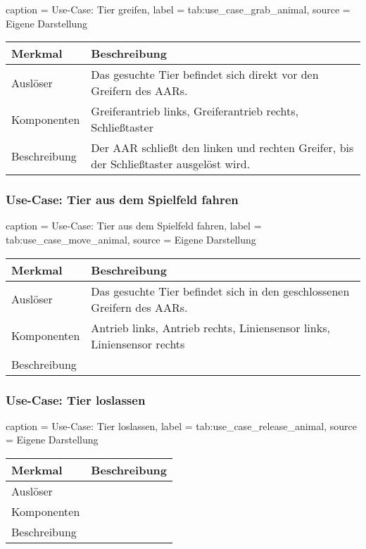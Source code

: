 \begin{dhbwtable}{%
    caption	= Use-Case: Tier greifen,
    label	= tab:use_case_grab_animal,
    source	= Eigene Darstellung
}
    \begin{tabular}{ll}
        \toprule
        \textbf{Merkmal}     & \textbf{Beschreibung}  \\\midrule
        Auslöser     & Das gesuchte Tier befindet sich direkt vor den Greifern des \acp{AAR}. \\
        Komponenten  & Greiferantrieb links, Greiferantrieb rechts, Schließtaster \\
        Beschreibung & Der \ac{AAR} schließt den linken und rechten Greifer, bis der Schließtaster ausgelöst wird.\\\bottomrule
    \end{tabular}    
\end{dhbwtable}

\subsubsection{Use-Case: Tier aus dem Spielfeld fahren}

\begin{dhbwtable}{%
    caption	= Use-Case: Tier aus dem Spielfeld fahren,
    label	= tab:use_case_move_animal,
    source	= Eigene Darstellung
}
    \begin{tabular}{ll}
        \toprule
        \textbf{Merkmal}     & \textbf{Beschreibung}  \\\midrule
        Auslöser     & Das gesuchte Tier befindet sich in den geschlossenen Greifern des \acp{AAR}.\\
        Komponenten  & Antrieb links, Antrieb rechts, Liniensensor links, Liniensensor rechts\\
        Beschreibung & \\\bottomrule
    \end{tabular}    
\end{dhbwtable}

\subsubsection{Use-Case: Tier loslassen}

\begin{dhbwtable}{%
    caption	= Use-Case: Tier loslassen,
    label	= tab:use_case_release_animal,
    source	= Eigene Darstellung
}
    \begin{tabular}{ll}
        \toprule
        \textbf{Merkmal}     & \textbf{Beschreibung}  \\\midrule
        Auslöser     &\\
        Komponenten  & \\
        Beschreibung & \\\bottomrule
    \end{tabular}    
\end{dhbwtable}

